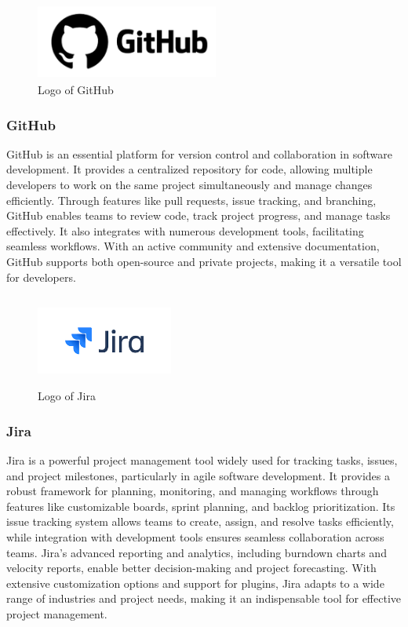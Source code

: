\documentclass[conference]{IEEEtran}
\begin{document}
        \begin{figure}[htbp]
            \centerline{\includegraphics[width=6cm, height=2.5cm]{Images/logo/github.png}}
            \caption{Logo of GitHub}
            \label{fig}
        \end{figure}
        \subsubsection{GitHub}
            GitHub is an essential platform for version control and collaboration in software development. It provides a centralized repository for code, allowing multiple developers to work on the same project simultaneously and manage changes efficiently. Through features like pull requests, issue tracking, and branching, GitHub enables teams to review code, track project progress, and manage tasks effectively. It also integrates with numerous development tools, facilitating seamless workflows. With an active community and extensive documentation, GitHub supports both open-source and private projects, making it a versatile tool for developers.

        \begin{figure}[htbp]
            \centerline{\includegraphics[width=4.5cm, height=3cm]{Images/logo/jira.png}}
            \caption{Logo of Jira}
            \label{fig}
        \end{figure}
        \subsubsection{Jira}
Jira is a powerful project management tool widely used for tracking tasks, issues, and project milestones, particularly in agile software development. It provides a robust framework for planning, monitoring, and managing workflows through features like customizable boards, sprint planning, and backlog prioritization. Its issue tracking system allows teams to create, assign, and resolve tasks efficiently, while integration with development tools ensures seamless collaboration across teams. Jira's advanced reporting and analytics, including burndown charts and velocity reports, enable better decision-making and project forecasting. With extensive customization options and support for plugins, Jira adapts to a wide range of industries and project needs, making it an indispensable tool for effective project management.
\end{document}
